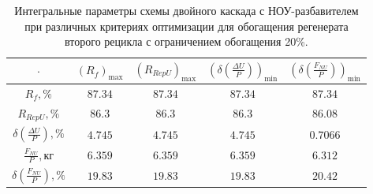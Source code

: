 \begin{table}
    \centering
    \begin{tabular}{|c|cccc|}
        \hline $\cdot$ & $(R_f)_\text{max}$ & $(R_{RepU})_\text{max}$ & $(\delta(\frac{\Delta U}{P}))_\text{min}$ & $(\delta(\frac{F_{NU}}{P}))_\text{min}$\\ \hline
        $R_f, \%$ & $87.34$ & $87.34$ & $87.34$ & $87.34$\\ \hline
        $R_{RepU}, \%$ & $86.3$ & $86.3$ & $86.3$ & $86.08$\\ \hline
        $\delta(\frac{\Delta U}{P}), \%$ & $4.745$ & $4.745$ & $4.745$ & $0.7066$\\ \hline
        $\frac{F_{NU}}{P}, \text{кг}$ & $6.359$ & $6.359$ & $6.359$ & $6.312$\\ \hline
        $\delta(\frac{F_{NU}}{P}), \%$ & $19.83$ & $19.83$ & $19.83$ & $20.42$\\ \hline
    \end{tabular}
    \caption{Интегральные параметры схемы двойного каскада с НОУ-разбавителем при различных критериях оптимизации для обогащения регенерата второго рецикла с ограничением обогащения 20\%.{\label{2opt2_20_int}}}
\end{table}


